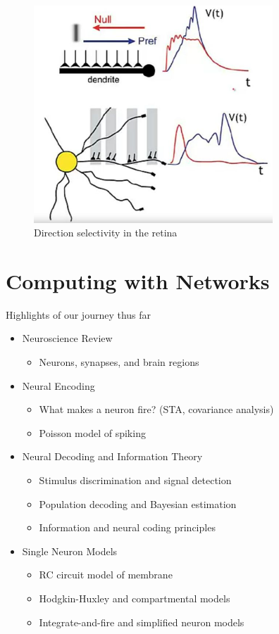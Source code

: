 \documentclass[]{article}
\begin{document}
\begin{figure}[H]
	\caption[Direction selectivity in the retina]{Direction selectivity in the retina}
	\includegraphics[width=0.8\textwidth]{detection-selectivity}
\end{figure}


\section{Computing with Networks}\label{sec:week6}
Highlights of our journey thus far
\begin{itemize}
	\item Neuroscience Review
	\begin{itemize}
		\item Neurons, synapses, and brain regions
	\end{itemize}
	\item Neural Encoding
	\begin{itemize}
		\item What makes a neuron fire? (STA, covariance analysis)
		\item Poisson model of spiking
	\end{itemize}
	\item Neural Decoding and Information Theory
	\begin{itemize}
		\item Stimulus discrimination and signal detection
		\item Population decoding and Bayesian estimation
		\item Information and neural coding principles
	\end{itemize}
	\item Single Neuron Models
	\begin{itemize}
		\item RC circuit model of membrane
		\item Hodgkin-Huxley and compartmental models
		\item Integrate-and-fire and simplified neuron models
	\end{itemize}
\end{itemize}
\end{document}
